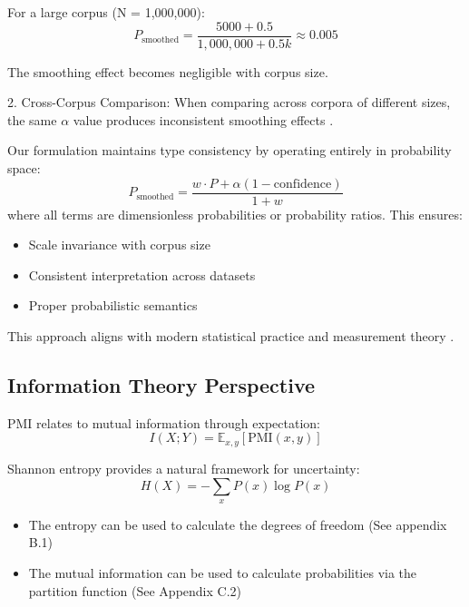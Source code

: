 \documentclass[12pt,a4paper]{article}
\begin{document}
   For a large corpus (N = 1,000,000):
   \begin{equation}
       P_{\text{smoothed}} = \frac{5000 + 0.5}{1,000,000 + 0.5k} \approx 0.005
   \end{equation}
   
   The smoothing effect becomes negligible with corpus size.

2. Cross-Corpus Comparison:
   When comparing across corpora of different sizes, the same $\alpha$ value produces inconsistent smoothing effects \cite{chen1999empirical}.

Our formulation maintains type consistency by operating entirely in probability space:
\begin{equation}
    P_{\text{smoothed}} = \frac{w \cdot P + \alpha(1 - \text{confidence})}{1 + w}
\end{equation}
where all terms are dimensionless probabilities or probability ratios. This ensures:
\begin{itemize}
    \item Scale invariance with corpus size
    \item Consistent interpretation across datasets
    \item Proper probabilistic semantics
\end{itemize}

This approach aligns with modern statistical practice \cite{gelman2013bayesian} and measurement theory \cite{hand2004measurement}.

\subsection{Information Theory Perspective}
PMI relates to mutual information through expectation:
\begin{equation}
    I(X;Y) = \mathbb{E}_{x,y}[\text{PMI}(x,y)]
\end{equation}

Shannon entropy provides a natural framework for uncertainty:
\begin{equation}
    H(X) = -\sum_x P(x)\log P(x)
\end{equation}

\begin{itemize}
    \item The entropy can be used to calculate the degrees of freedom (See appendix B.1)
    \item The mutual information can be used to calculate probabilities via the partition function (See Appendix C.2)
\end{itemize}
\end{document}
